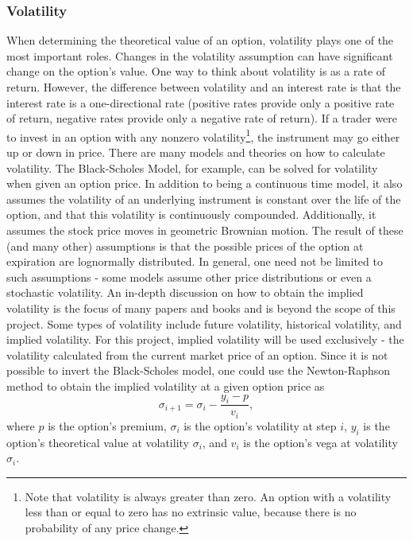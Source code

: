 \documentclass[12pt, a4paper, notitlepage]{article}
\numberwithin{equation}{subsection}
\numberwithin{figure}{subsection}
\numberwithin{table}{subsection}
\newcommand{\newpar}{\newline \newline}
\begin{document}
\subsubsection{Volatility}
When determining the theoretical value of an option, volatility plays one of the most important roles.  Changes in the volatility assumption can have significant change on the option's value.  One way to think about volatility is as a rate of return.  However, the difference between volatility and an interest rate is that the interest rate is a one-directional rate (positive rates provide only a positive rate of return, negative rates provide only a negative rate of return).  If a trader were to invest in an option with any nonzero volatility\footnote{Note that volatility is always greater than zero.  An option with a volatility less than or equal to zero has no extrinsic value, because there is no probability of any price change.}, the instrument may go either up or down in price.
\newpar
There are many models and theories on how to calculate volatility. The Black-Scholes Model, for example, can be solved for volatility when given an option price.  In addition to being a continuous time model, it also assumes the volatility of an underlying instrument is constant over the life of the option, and that this volatility is continuously compounded.  Additionally, it assumes the stock price moves in geometric Brownian motion.  The result of these (and many other) assumptions is that the possible prices of the option at expiration are lognormally distributed.  In general, one need not be limited to such assumptions - some models assume other price distributions or even a stochastic volatility. An in-depth discussion on how to obtain the implied volatility is the focus of many papers and books and is beyond the scope of this project.
\newpar
Some types of volatility include future volatility, historical volatility, and implied volatility.  For this project, implied volatility will be used exclusively - the volatility calculated from the current market price of an option.  Since it is not possible to invert the Black-Scholes model, one could use the Newton-Raphson method to obtain the implied volatility at a given option price as
\begin{equation*}
	\sigma_{i+1} = \sigma_{i} - \frac{y_{i} - p}{v_{i}},
\end{equation*}
where $p$ is the option's premium, $\sigma_i$ is the option's volatility at step $i$, $y_{i}$ is the option's theoretical value at volatility $\sigma_i$, and $v_i$ is the option's vega at volatility $\sigma_i$.
\end{document}
